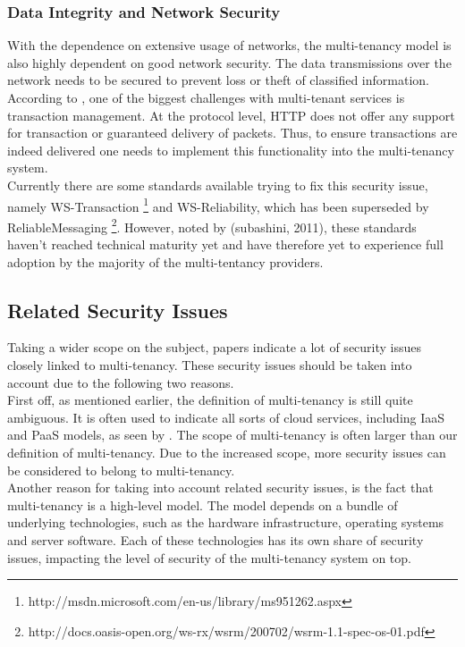 {{\subsubsection{Data Integrity and Network Security}
With the dependence on extensive usage of networks, the multi-tenancy model is also highly dependent on good network security.  The data transmissions over the network needs to be secured to prevent loss or theft of classified information. According to \cite{Subashini2011Security}, one of the biggest challenges with multi-tenant services is transaction management. At the protocol level, HTTP does not offer any support for transaction or guaranteed delivery of packets. Thus, to ensure transactions are indeed delivered one needs to implement this functionality into the multi-tenancy system.\\
	Currently there are some standards available trying to fix this security issue, namely WS-Transaction \footnote{http://msdn.microsoft.com/en-us/library/ms951262.aspx} and WS-Reliability, which has been superseded by ReliableMessaging \footnote{http://docs.oasis-open.org/ws-rx/wsrm/200702/wsrm-1.1-spec-os-01.pdf}. However, noted by (subashini, 2011), these standards haven’t reached technical maturity yet and have therefore yet to experience full adoption by the majority of the multi-tentancy providers.\\

\subsection{Related Security Issues}
Taking a wider scope on the subject, papers indicate a lot of security issues closely linked to multi-tenancy. These security issues should be taken into account due to the following two reasons.\\
First off, as mentioned earlier, the definition of multi-tenancy is still quite ambiguous. It is often used to indicate all sorts of cloud services, including IaaS and PaaS models, as seen by \cite{Jasti2010Security}. The scope of multi-tenancy is often larger than our definition of multi-tenancy. Due to the increased scope, more security issues can be considered to belong to multi-tenancy. \\
Another reason for taking into account related security issues, is the fact that multi-tenancy is a high-level model. The model depends on a bundle of underlying technologies, such as the hardware infrastructure, operating systems and server software. Each of these technologies has its own share of security issues, impacting the level of security of the multi-tenancy system on top. \\

}}
